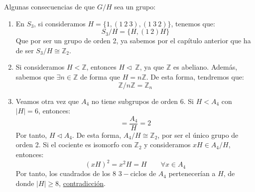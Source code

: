 \begin{ejemplo}
    Algunas consecuencias de que $G/H$ sea un grupo:
    \begin{enumerate}
        \item En $S_3$, si consideramos $H = \{1, (1\ 2\ 3), (1\ 3\ 2)\}$, tenemos que:
            \begin{equation*}
                S_3/H = \{H, (1\ 2)H\} 
            \end{equation*}
            Que por ser un grupo de orden 2, ya sabemos por el capítulo anterior que ha de ser $S_3/H\cong\mathbb{Z}_2$.
        \item Si consideramos $H<\mathbb{Z}$, entonces $H\lhd\ \mathbb{Z}$, ya que $\mathbb{Z}$ es abeliano. Además, sabemos que $\exists n\in \mathbb{Z}$ de forma que $H = n\mathbb{Z}$. De esta forma, tendremos que:
            \begin{equation*}
                \mathbb{Z}/n\mathbb{Z} = \mathbb{Z}_n
            \end{equation*}
        \item Veamos otra vez que $A_4$ no tiene subgrupos de orden 6. Si $H<A_4$ con $|H| = 6$, entonces:
            \begin{equation*}
                [A_4:H] = \dfrac{A_4}{H} = 2
            \end{equation*}
            Por tanto, $H\lhd A_4$. De esta forma, $A_4/H\cong \mathbb{Z}_2$, por ser el único grupo de orden 2. Si el cociente es isomorfo con $\mathbb{Z}_2$ y consideramos $xH\in A_4/H$, entonces:
            \begin{equation*}
                {(xH)}^{2} = x^2H = H \qquad \forall x\in A_4
            \end{equation*}
            Por tanto, los cuadrados de los 8 $3-$ciclos de $A_4$ pertenecerían a $H$, de donde $|H| \geq 8$, \underline{contradicción}.
    \end{enumerate}
\end{ejemplo}


